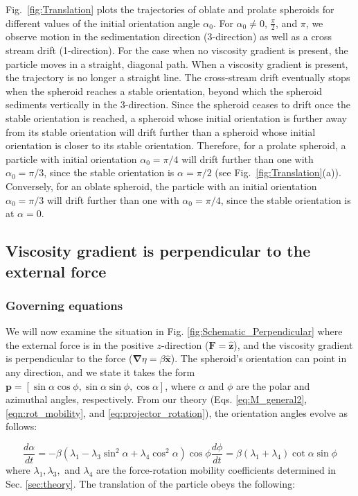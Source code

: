 \documentclass{jfm}
\begin{document}
Fig.~\ref{fig:Translation} plots the trajectories of oblate and prolate spheroids for different values of the initial orientation angle $\alpha_{0}$. For $\alpha_0 \neq 0$, $\frac{\pi}{2}$, and $\pi$, we observe motion in the sedimentation direction (3-direction) as well as a cross stream drift (1-direction).  For the case when no viscosity gradient is present, the particle moves in a straight, diagonal path.  When a viscosity gradient is present, the trajectory is no longer a straight line.  The cross-stream drift eventually stops when the spheroid reaches a stable orientation, beyond which the spheroid sediments vertically in the $3$-direction. Since the spheroid ceases to drift once the stable orientation is reached, a spheroid whose initial orientation is further away from its stable orientation will drift further than a spheroid whose initial orientation is closer to its stable orientation. Therefore, for a prolate spheroid, a particle with initial orientation $\alpha_0 =\pi/4$ will drift further than one with $\alpha_0 = \pi/3$, since the stable orientation is $\alpha =\pi/2$ (see Fig.~\ref{fig:Translation}(a)). Conversely, for an oblate spheroid, the particle with an initial orientation $\alpha_{0} =\pi/3$ will drift further than one with $\alpha_{0} =\pi/4$, since the stable orientation is at $\alpha =0$.

\subsection{Viscosity gradient is perpendicular to the external force}
\subsubsection{Governing equations}
We will now examine the situation in Fig. \ref{fig:Schematic_Perpendicular} where the external force is in the positive $z$-direction ($\boldsymbol{F} = \boldsymbol{\hat{z}}$), and the viscosity gradient is perpendicular to the force ($\boldsymbol{\nabla}\eta = \beta \boldsymbol{\hat{x}}$).  The spheroid’s orientation can point in any direction, and we state it takes the form $\boldsymbol{p} = [\sin\alpha \cos\phi, \sin\alpha \sin\phi, \cos\alpha]$, where $\alpha$ and $\phi$ are the polar and azimuthal angles, respectively.  From our theory (Eqs. \eqref{eq:M_general2}, \eqref{eqn:rot_mobility}, and \eqref{eq:projector_rotation}), the orientation angles evolve as follows:


\begin{subequations} \label{eqn:angles_perp}
\begin{equation} \label{eqn:alpha_perp}
\frac{d \alpha}{dt} = -\beta \left(\lambda_1 -\lambda_3 \sin^2\alpha + \lambda_4 \cos^2\alpha \right) \cos\phi 
\end{equation}
\begin{equation} \label{eqn:phi_perp}
\frac{d \phi}{d t} = \beta (\lambda_1 + \lambda_4) \cot \alpha \sin\phi
\end{equation}
\end{subequations}
where $\lambda_1, \lambda_3,$ and $\lambda_4$ are the force-rotation mobility coefficients determined in Sec. \ref{sec:theory}.  The translation of the particle obeys the following:
\end{document}
